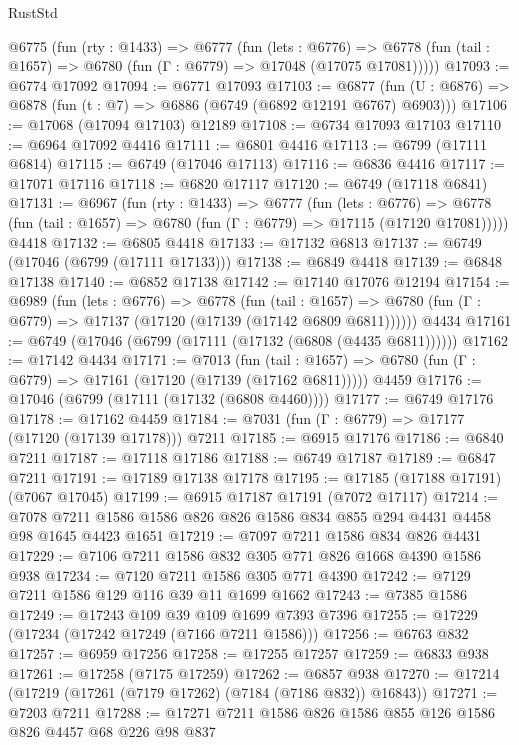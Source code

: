 \begin{lexlean}{RustStd}
\begin{coremodule}
  @6775
    (fun (rty : @1433) =>
    @6777
      (fun (lets : @6776) =>
      @6778 (fun (tail : @1657) => @6780 (fun (Γ : @6779) => @17048 (@17075 @17081)))))
@17093 := @6774 @17092
@17094 := @6771 @17093
@17103 := @6877
    (fun (U : @6876) => @6878 (fun (t : @7) => @6886 (@6749 (@6892 @12191 @6767) @6903)))
@17106 := @17068 (@17094 @17103) @12189
@17108 := @6734 @17093 @17103
@17110 := @6964 @17092 @4416
@17111 := @6801 @4416
@17113 := @6799 (@17111 @6814)
@17115 := @6749 (@17046 @17113)
@17116 := @6836 @4416
@17117 := @17071 @17116
@17118 := @6820 @17117
@17120 := @6749 (@17118 @6841)
@17131 := @6967
    (fun (rty : @1433) =>
    @6777
      (fun (lets : @6776) =>
      @6778 (fun (tail : @1657) => @6780 (fun (Γ : @6779) => @17115 (@17120 @17081)))))
    @4418
@17132 := @6805 @4418
@17133 := @17132 @6813
@17137 := @6749 (@17046 (@6799 (@17111 @17133)))
@17138 := @6849 @4418
@17139 := @6848 @17138
@17140 := @6852 @17138
@17142 := @17140 @17076 @12194
@17154 := @6989
    (fun (lets : @6776) =>
    @6778
      (fun (tail : @1657) =>
      @6780 (fun (Γ : @6779) => @17137 (@17120 (@17139 (@17142 @6809 @6811))))))
    @4434
@17161 := @6749 (@17046 (@6799 (@17111 (@17132 (@6808 (@4435 @6811))))))
@17162 := @17142 @4434
@17171 := @7013
    (fun (tail : @1657) => @6780 (fun (Γ : @6779) => @17161 (@17120 (@17139 (@17162 @6811)))))
    @4459
@17176 := @17046 (@6799 (@17111 (@17132 (@6808 @4460))))
@17177 := @6749 @17176
@17178 := @17162 @4459
@17184 := @7031 (fun (Γ : @6779) => @17177 (@17120 (@17139 @17178))) @7211
@17185 := @6915 @17176
@17186 := @6840 @7211
@17187 := @17118 @17186
@17188 := @6749 @17187
@17189 := @6847 @7211
@17191 := @17189 @17138 @17178
@17195 := @17185 (@17188 @17191) (@7067 @17045)
@17199 := @6915 @17187 @17191 (@7072 @17117)
@17214 := @7078 @7211 @1586 @1586 @826 @826 @1586 @834 @855 @294 @4431 @4458 @98 @1645 @4423 @1651
@17219 := @7097 @7211 @1586 @834 @826 @4431
@17229 := @7106 @7211 @1586 @832 @305 @771 @826 @1668 @4390 @1586 @938
@17234 := @7120 @7211 @1586 @305 @771 @4390
@17242 := @7129 @7211 @1586 @129 @116 @39 @11 @1699 @1662
@17243 := @7385 @1586
@17249 := @17243 @109 @39 @109 @1699 @7393 @7396
@17255 := @17229 (@17234 (@17242 @17249 (@7166 @7211 @1586)))
@17256 := @6763 @832
@17257 := @6959 @17256
@17258 := @17255 @17257
@17259 := @6833 @938
@17261 := @17258 (@7175 @17259)
@17262 := @6857 @938
@17270 := @17214 (@17219 (@17261 (@7179 @17262) (@7184 (@7186 @832)) @16843))
@17271 := @7203 @7211
@17288 := @17271
    @7211
    @1586
    @826
    @1586
    @855
    @126
    @1586
    @826
    @4457
    @68
    @226
    @98
    @837

\end{coremodule}
\end{lexlean}
